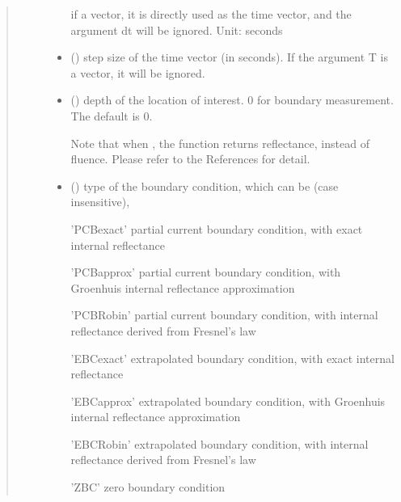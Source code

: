 \documentclass[letterpaper,10pt,english]{sphinxmanual}
\begin{document}
\begin{fulllineitems}
\begin{quote}
\begin{description}
\begin{itemize}
\sphinxAtStartPar
if a vector, it is directly used as the time vector, and the argument dt will be ignored. Unit: seconds


\item {} 
\sphinxAtStartPar
{} () \textendash{} step size of the time vector (in seconds). If the argument T is a vector, it will be ignored.

\item {} 
\sphinxAtStartPar
{} (\sphinxstyleliteralemphasis{\sphinxupquote{, }}) \textendash{} 
\sphinxAtStartPar
depth of the location of interest. 0 for boundary measurement. The default is 0.

\sphinxAtStartPar
Note that when , the function returns reflectance, instead of fluence. Please refer to the References for detail.


\item {} 
\sphinxAtStartPar
{} (\sphinxstyleliteralemphasis{\sphinxupquote{, }}) \textendash{} 
\sphinxAtStartPar
type of the boundary condition, which can be (case insensitive),

\sphinxAtStartPar
’PCB\sphinxhyphen{}exact’ \sphinxhyphen{} partial current boundary condition, with exact internal reflectance

\sphinxAtStartPar
’PCB\sphinxhyphen{}approx’ \sphinxhyphen{} partial current boundary condition, with Groenhuis internal reflectance approximation

\sphinxAtStartPar
’PCB\sphinxhyphen{}Robin’ \sphinxhyphen{} partial current boundary condition, with internal reflectance derived from Fresnel’s law

\sphinxAtStartPar
’EBC\sphinxhyphen{}exact’ \sphinxhyphen{} extrapolated boundary condition, with exact internal reflectance

\sphinxAtStartPar
’EBC\sphinxhyphen{}approx’ \sphinxhyphen{} extrapolated boundary condition, with Groenhuis internal reflectance approximation

\sphinxAtStartPar
’EBC\sphinxhyphen{}Robin’ \sphinxhyphen{} extrapolated boundary condition, with internal reflectance derived from Fresnel’s law

\sphinxAtStartPar
’ZBC’ \sphinxhyphen{} zero boundary condition


\end{itemize}
\end{description}
\end{quote}
\end{fulllineitems}
\end{document}
